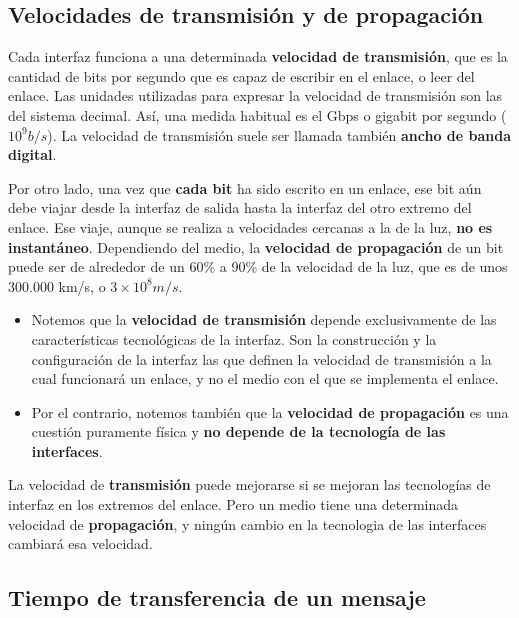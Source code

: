 \documentclass[spanish,A4,]{article}
\begin{document}
\subsection{Velocidades de transmisión y de
propagación}\label{velocidades-de-transmisiuxf3n-y-de-propagaciuxf3n}

Cada interfaz funciona a una determinada \textbf{velocidad de
transmisión}, que es la cantidad de bits por segundo que es capaz de
escribir en el enlace, o leer del enlace. Las unidades utilizadas para
expresar la velocidad de transmisión son las del sistema decimal. Así,
una medida habitual es el Gbps o gigabit por segundo ($10^9 b/s$). La
velocidad de transmisión suele ser llamada también \textbf{ancho de
banda digital}.

Por otro lado, una vez que \textbf{cada bit} ha sido escrito en un
enlace, ese bit aún debe viajar desde la interfaz de salida hasta la
interfaz del otro extremo del enlace. Ese viaje, aunque se realiza a
velocidades cercanas a la de la luz, \textbf{no es instantáneo}.
Dependiendo del medio, la \textbf{velocidad de propagación} de un bit
puede ser de alrededor de un 60\% a 90\% de la velocidad de la luz, que
es de unos 300.000 km/s, o $3\times 10^8 m/s$.

\begin{itemize}
\itemsep1pt\parskip0pt
\item
  Notemos que la \textbf{velocidad de transmisión} depende
  exclusivamente de las características tecnológicas de la interfaz. Son
  la construcción y la configuración de la interfaz las que definen la
  velocidad de transmisión a la cual funcionará un enlace, y no el medio
  con el que se implementa el enlace.
\item
  Por el contrario, notemos también que la \textbf{velocidad de
  propagación} es una cuestión puramente física y \textbf{no depende de
  la tecnología de las interfaces}.
\end{itemize}

La velocidad de \textbf{transmisión} puede mejorarse si se mejoran las
tecnologías de interfaz en los extremos del enlace. Pero un medio tiene
una determinada velocidad de \textbf{propagación}, y ningún cambio en la
tecnologia de las interfaces cambiará esa velocidad.

\subsection{Tiempo de transferencia de un
mensaje}\label{tiempo-de-transferencia-de-un-mensaje}
\end{document}

